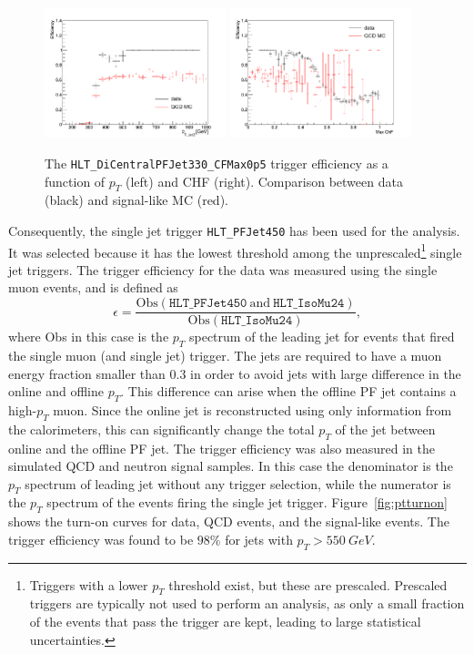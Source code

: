 \begin{figure}[ht]
  \centering
  \includegraphics[width=0.47\textwidth]{figures/trigger/pt_eff_05_DataSIMP.png}\hfill%
  \includegraphics[width=0.47\textwidth]{figures/trigger/chf_eff_05_DataSIMP.png}
  \caption{The \texttt{HLT\_DiCentralPFJet330\_CFMax0p5} trigger efficiency as a function of $p_{T}$ (left) and CHF (right). Comparison between data (black) and signal-like MC (red).}
  \label{fig:efficiencies_simp_data}
\end{figure}

Consequently, the single jet trigger \texttt{HLT\_PFJet450} has been used for the analysis. It was selected because it has the lowest threshold among the unprescaled\footnote{Triggers with a lower $p_T$ threshold exist, but these are prescaled. Prescaled triggers are typically not used to perform an analysis, as only a small fraction of the events that pass the trigger are kept, leading to large statistical uncertainties.} single jet triggers. The trigger efficiency for the data was measured using the single muon events, and is defined as
\begin{equation}
\epsilon = \frac{\mathrm{Obs}(\texttt{HLT\_PFJet450}\ \mathrm{and}\ \texttt{HLT\_IsoMu24})}{\mathrm{Obs}(\texttt{HLT\_IsoMu24})},
\end{equation} 
where Obs in this case is the $p_T$ spectrum of the leading jet for events that fired the single muon (and single jet) trigger. The jets are required to have a muon energy fraction smaller than $0.3$ in order to avoid jets with large difference in the online and offline $p_T$. This difference can arise when the offline \ac{PF} jet contains a high-$p_T$ muon. Since the online jet is reconstructed using only information from the calorimeters, this can significantly change the total $p_T$ of the jet between online and the offline \ac{PF} jet. The trigger efficiency was also measured in the simulated \acs{QCD} and neutron signal samples. In this case the denominator is the $p_T$ spectrum of leading jet without any trigger selection, while the numerator is the $p_T$ spectrum of the events firing the single jet trigger. Figure~\ref{fig:ptturnon} shows the turn-on curves for data, \acs{QCD} events, and the signal-like events. The trigger efficiency was found to be $98\%$ for jets with $p_{T}>\SI{550}{GeV}$.

